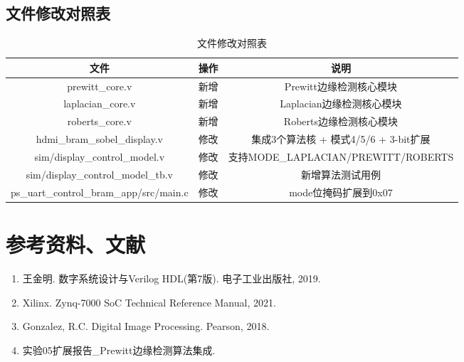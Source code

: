 \subsection{文件修改对照表}

\begin{table}[h]
    \centering
    \begin{tabular}{|c|c|c|}
        \hline
        文件 & 操作 & 说明 \\
        \hline
        prewitt\_core.v & 新增 & Prewitt边缘检测核心模块 \\
        \hline
        laplacian\_core.v & 新增 & Laplacian边缘检测核心模块 \\
        \hline
        roberts\_core.v & 新增 & Roberts边缘检测核心模块 \\
        \hline
        hdmi\_bram\_sobel\_display.v & 修改 & 集成3个算法核 + 模式4/5/6 + 3-bit扩展 \\
        \hline
        sim/display\_control\_model.v & 修改 & 支持MODE\_LAPLACIAN/PREWITT/ROBERTS \\
        \hline
        sim/display\_control\_model\_tb.v & 修改 & 新增算法测试用例 \\
        \hline
        ps\_uart\_control\_bram\_app/src/main.c & 修改 & mode位掩码扩展到0x07 \\
        \hline
    \end{tabular}
    \caption{文件修改对照表}
    \label{tab:file_changes}
\end{table}

\clearpage
\section{参考资料、文献}
\begin{enumerate}
    \item 王金明. 数字系统设计与Verilog HDL(第7版). 电子工业出版社, 2019.
    \item Xilinx. Zynq-7000 SoC Technical Reference Manual, 2021.
    \item Gonzalez, R.C. Digital Image Processing. Pearson, 2018.
    \item 实验05扩展报告\_Prewitt边缘检测算法集成.
\end{enumerate}
